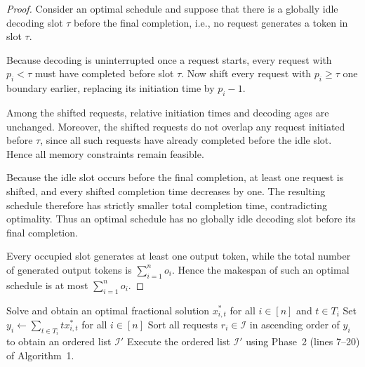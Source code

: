 \documentclass[nonblindrev]{informs3_hide}
\newcommand{\sortLP}{\texttt{Sorted-LP}}
\begin{document}
\begin{proof}
Consider an optimal schedule and suppose that there is a globally idle
decoding slot $\tau$ before the final completion, i.e., no request
generates a token in slot $\tau$.

Because decoding is uninterrupted once a request starts, every request
with $p_i<\tau$ must have completed before slot $\tau$. Now shift every
request with $p_i\ge \tau$ one boundary earlier, replacing its initiation
time by $p_i-1$.

Among the shifted requests, relative initiation times and decoding ages
are unchanged. Moreover, the shifted requests do not overlap any request
initiated before $\tau$, since all such requests have already completed
before the idle slot. Hence all memory constraints remain feasible.

Because the idle slot occurs before the final completion, at least one
request is shifted, and every shifted completion time decreases by one.
The resulting schedule therefore has strictly smaller total completion
time, contradicting optimality. Thus an optimal schedule has no globally
idle decoding slot before its final completion.

Every occupied slot generates at least one output token, while the total
number of generated output tokens is $\sum_{i=1}^n o_i$. Hence the
makespan of such an optimal schedule is at most $\sum_{i=1}^n o_i$.
\end{proof}

\begin{algorithm}[htbp]
\caption{\sortLP} \label{algorithm_sortLP}
\begin{algorithmic}[1]
\State Solve  and obtain an optimal fractional solution $x^*_{i,t}$ for all $i\in[n]$ and $t\in T_i$
\State Set $y_i \leftarrow \sum_{t\in T_i} t x^*_{i,t}$ for all $i\in[n]$
\State Sort all requests $r_i \in \mathcal{I}$ in ascending order of $y_i$ to obtain an ordered list $\mathcal{I}'$
\State Execute the ordered list $\mathcal I'$ using Phase~2 (lines 7--20) of Algorithm~1.
\end{algorithmic}
\end{algorithm}
\end{document}
